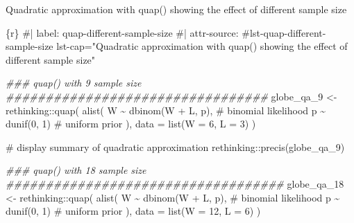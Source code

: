 \documentclass[
  letterpaper,
  DIV=11,
  numbers=noendperiod]{scrreprt}
\newenvironment{Shaded}{\begin{snugshade}}{\end{snugshade}}
\newcommand{\AttributeTok}[1]{\textcolor[rgb]{0.40,0.45,0.13}{#1}}
\newcommand{\CommentTok}[1]{\textcolor[rgb]{0.37,0.37,0.37}{#1}}
\newcommand{\DecValTok}[1]{\textcolor[rgb]{0.68,0.00,0.00}{#1}}
\newcommand{\DocumentationTok}[1]{\textcolor[rgb]{0.37,0.37,0.37}{\textit{#1}}}
\newcommand{\FunctionTok}[1]{\textcolor[rgb]{0.28,0.35,0.67}{#1}}
\newcommand{\InformationTok}[1]{\textcolor[rgb]{0.37,0.37,0.37}{#1}}
\newcommand{\NormalTok}[1]{\textcolor[rgb]{0.00,0.23,0.31}{#1}}
\newcommand{\OtherTok}[1]{\textcolor[rgb]{0.00,0.23,0.31}{#1}}
\newcommand{\SpecialCharTok}[1]{\textcolor[rgb]{0.37,0.37,0.37}{#1}}
\begin{document}
\begin{codelisting}

\caption{Quadratic approximation with quap() showing the effect of
different sample size}

\hypertarget{lst-quap-different-sample-size}{%
\label{lst-quap-different-sample-size}}%
\begin{Shaded}
\begin{Highlighting}[]
\InformationTok{\textasciigrave{}\textasciigrave{}\textasciigrave{}\{r\}}
\CommentTok{\#| label: quap{-}different{-}sample{-}size}
\CommentTok{\#| attr{-}source: \textquotesingle{}\#lst{-}quap{-}different{-}sample{-}size lst{-}cap="Quadratic approximation with quap() showing the effect of different sample size"\textquotesingle{}}

\DocumentationTok{\#\#\# quap() with 9 sample size \#\#\#\#\#\#\#\#\#\#\#\#\#\#\#\#\#\#\#\#\#\#\#\#\#\#\#\#\#\#\#\#\#}
\NormalTok{globe\_qa\_9 }\OtherTok{\textless{}{-}}\NormalTok{ rethinking}\SpecialCharTok{::}\FunctionTok{quap}\NormalTok{(}
  \FunctionTok{alist}\NormalTok{(}
\NormalTok{    W }\SpecialCharTok{\textasciitilde{}} \FunctionTok{dbinom}\NormalTok{(W }\SpecialCharTok{+}\NormalTok{ L, p), }\CommentTok{\# binomial likelihood}
\NormalTok{    p }\SpecialCharTok{\textasciitilde{}} \FunctionTok{dunif}\NormalTok{(}\DecValTok{0}\NormalTok{, }\DecValTok{1}\NormalTok{) }\CommentTok{\# uniform prior}
\NormalTok{  ),}
  \AttributeTok{data =} \FunctionTok{list}\NormalTok{(}\AttributeTok{W =} \DecValTok{6}\NormalTok{, }\AttributeTok{L =} \DecValTok{3}\NormalTok{)}
\NormalTok{)}

\CommentTok{\# display summary of quadratic approximation}
\NormalTok{rethinking}\SpecialCharTok{::}\FunctionTok{precis}\NormalTok{(globe\_qa\_9)}

\DocumentationTok{\#\#\# quap() with 18 sample size \#\#\#\#\#\#\#\#\#\#\#\#\#\#\#\#\#\#\#\#\#\#\#\#\#\#\#\#\#\#\#\#\#\#\#}
\NormalTok{globe\_qa\_18 }\OtherTok{\textless{}{-}}\NormalTok{ rethinking}\SpecialCharTok{::}\FunctionTok{quap}\NormalTok{(}
  \FunctionTok{alist}\NormalTok{(}
\NormalTok{    W }\SpecialCharTok{\textasciitilde{}} \FunctionTok{dbinom}\NormalTok{(W }\SpecialCharTok{+}\NormalTok{ L, p), }\CommentTok{\# binomial likelihood}
\NormalTok{    p }\SpecialCharTok{\textasciitilde{}} \FunctionTok{dunif}\NormalTok{(}\DecValTok{0}\NormalTok{, }\DecValTok{1}\NormalTok{) }\CommentTok{\# uniform prior}
\NormalTok{  ),}
  \AttributeTok{data =} \FunctionTok{list}\NormalTok{(}\AttributeTok{W =} \DecValTok{12}\NormalTok{, }\AttributeTok{L =} \DecValTok{6}\NormalTok{)}
\NormalTok{)}


\end{Highlighting}
\end{Shaded}
\end{codelisting}
\end{document}
